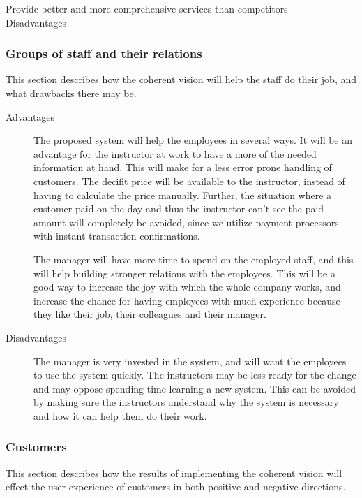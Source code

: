 \begin{description}
\item[Provide better and more comprehensive services than competitors]



\item[Disadvantages]


\end{description}

\subsubsection{Groups of staff and their relations}
This section describes how the coherent vision will help the staff do their 
job, and what drawbacks there may be. 

\begin{description}
\item[Advantages]
The proposed system will help the employees in several ways. It will be an
advantage for the instructor at work to have a more of the needed information
at hand. This will make for a less error prone handling of customers. The 
decifit price will be available to the instructor, instead of having to 
calculate the price manually. Further, the situation where a customer paid on 
the day and thus the instructor can't see the paid amount will completely be 
avoided, since we utilize payment processors with instant transaction 
confirmations.

The manager will have more time to spend on the employed staff, and this will
help building stronger relations with the employees. This will be a
good way to increase the joy with which the whole company works, and increase
the chance for having employees with much experience because they like their 
job, their colleagues and their manager.

\item[Disadvantages]
The manager is very invested in the system, and will want the employees to 
use the system quickly. The instructors may be less ready for the change and may
oppose spending time learning a new system. This can be avoided by making sure 
the instructors understand why the system is necessary and how it can help them 
do their work.
\end{description}

\subsubsection{Customers}
This section describes how the results of implementing the coherent vision will 
effect the user experience of customers in both positive and negative 
directions.

